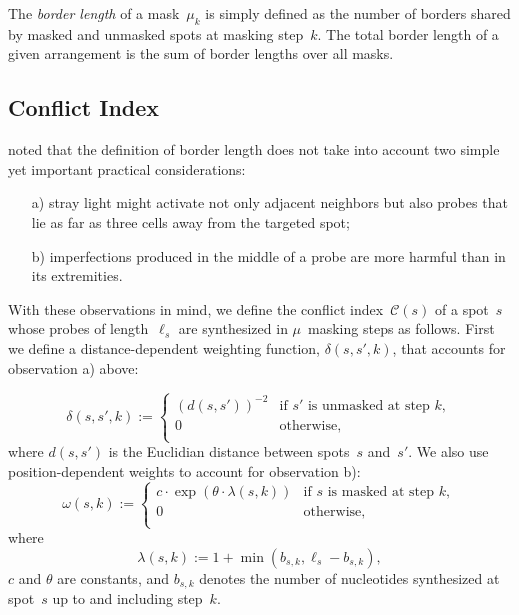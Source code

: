 \documentclass{bioinfo}
\begin{document}
The \emph{border length} of a mask~$\mu_{k}$ is simply defined as the number of borders shared by masked and unmasked spots at masking step~$k$. The total border length of a given arrangement is the sum of border lengths over all masks.

\subsection{Conflict Index}

\citealp{KAHNG03_1} noted that the definition of border length does not take into account two simple yet important practical considerations:
\begin{itemize}
\item[a)] stray light might activate not only adjacent neighbors but also probes that lie as far as three cells away from the targeted spot;
\item[b)] imperfections produced in the middle of a probe are more harmful than in its extremities.
\end{itemize}

With these observations in mind, we define the conflict index~$\mathcal{C}(s)$ of a spot~$s$ whose probes of length~$\ell_{s}$ are synthesized in $\mu$~masking steps as follows. First we define a distance-dependent weighting function, $\delta(s,s',k)$, that accounts for observation a) above:

\begin{equation}
\label{eq:dist_weight}
\delta(s,s',k) :=
        \left\{
                \begin{array}{ll}
                        (d(s,s'))^{-2} & \mbox{if $s'$ is unmasked at step $k$}, \\
                        0 & \mbox{otherwise}, \\
                \end{array}
        \right.
\end{equation}
where $d(s,s')$ is the Euclidian distance between spots~$s$ and~$s'$. We also use position-dependent weights to account for observation b):
\begin{equation}
\label{eq:pos_mult}
\omega(s,k) :=
        \left\{
                \begin{array}{ll}
                        c \cdot \exp{\left(\theta \cdot \lambda(s,k)\right)} & \mbox{if $s$ is masked at step $k$}, \\
                        0 & \mbox{otherwise}, \\
                \end{array}
        \right.
\end{equation}
where
\begin{equation}
\label{eq:base_pos}
\lambda(s,k) := 1 + \min(b_{s,k},\ell_{s} - b_{s,k}),
\end{equation}
$c$ and $\theta$ are constants, and $b_{s,k}$ denotes the number of nucleotides synthesized at spot~$s$ up to and including step~$k$.
\end{document}
